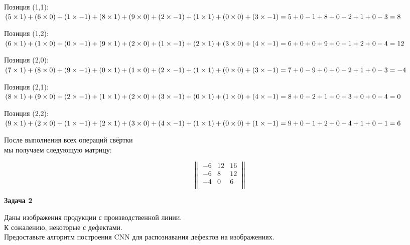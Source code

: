 \begin{description}
Позиция (1,1):
$
(5 \times 1) + (6 \times 0) + (1 \times -1) + \\
(8 \times 1) + (9 \times 0) + (2 \times -1) + \\
(1 \times 1) + (0 \times 0) + (3 \times -1) = \\
5 + 0 - 1 + 8 + 0 - 2 + 1 + 0 - 3 = 8
$

Позиция (1,2):
$
(6 \times 1) + (1 \times 0) + (0 \times -1) + \\
(9 \times 1) + (2 \times 0) + (1 \times -1) + \\
(2 \times 1) + (3 \times 0) + (4 \times -1) = \\
6 + 0 + 0 + 9 + 0 - 1 + 2 + 0 - 4 = 12
$

Позиция (2,0):
$
(7 \times 1) + (8 \times 0) + (9 \times -1) + \\
(0 \times 1) + (1 \times 0) + (2 \times -1) + \\
(1 \times 1) + (0 \times 0) + (3 \times -1) = \\
7 + 0 - 9 + 0 + 0 - 2 + 1 + 0 - 3 = -4
$

Позиция (2,1):
$
(8 \times 1) + (9 \times 0) + (2 \times -1) + \\
(1 \times 1) + (2 \times 0) + (3 \times -1) + \\
(0 \times 1) + (1 \times 0) + (4 \times -1) = \\
8 + 0 - 2 + 1 + 0 - 3 + 0 + 0 - 4 = 0
$

Позиция (2,2):
$
(9 \times 1) + (2 \times 0) + (1 \times -1) + \\
(2 \times 1) + (3 \times 0) + (4 \times -1) + \\
(1 \times 1) + (0 \times 0) + (1 \times -1) = \\
9 + 0 - 1 + 2 + 0 - 4 + 1 + 0 - 1 = 6
$

После выполнения всех операций свёртки\\
мы получаем следующую матрицу:

$$
\begin{Vmatrix}
-6 & 12 & 16 \\
-6 & 8 & 12 \\
-4 & 0 & 6 \\
\end{Vmatrix}
$$

\newpage
\textbf{Задача 2}

Даны изображения продукции с производственной линии.\\
К сожалению, некоторые с дефектами.\\
Предоставьте алгоритм построения CNN для распознавания дефектов на изображениях.


\end{description}
